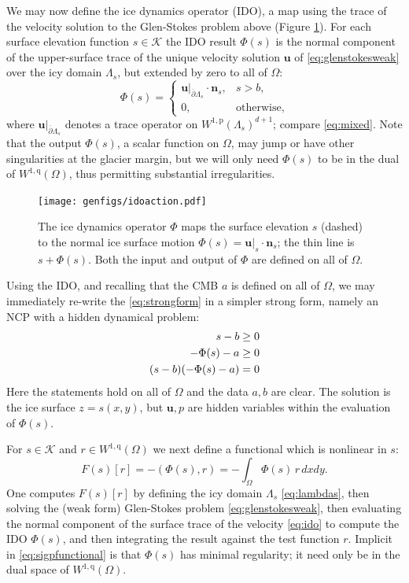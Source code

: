 \documentclass[letterpaper,final,12pt,reqno]{amsart}
\theoremstyle{claim}
\newcommand{\bn}{\mathbf{n}}
\newcommand{\bu}{\mathbf{u}}
\newcommand{\ip}[2]{\left(#1,#2\right)}
\newcommand{\pp}{{\text{p}}}
\newcommand{\qq}{{\text{q}}}
\numberwithin{equation}{section}
\numberwithin{figure}{section}
\numberwithin{table}{section}
\numberwithin{theorem}{section}
\begin{document}
We may now define the ice dynamics operator (IDO), a map using the trace of the velocity solution to the Glen-Stokes problem above (Figure \ref{fig:idoaction}).  For each surface elevation function $s \in \mathcal{K}$ the IDO result $\Phi(s)$ is the normal component of the upper-surface trace of the unique velocity solution $\bu$ of \eqref{eq:glenstokesweak} over the icy domain $\Lambda_s$, but extended by zero to all of $\Omega$:
\begin{equation}
\Phi(s) = \begin{cases} \bu|_{\overline{\partial} \Lambda_s} \cdot \bn_s, & s > b, \\
                        0, & \text{otherwise}, \end{cases} \label{eq:ido}
\end{equation}
where $\bu|_{\overline{\partial} \Lambda_s}$ denotes a trace operator on $W^{1,\pp}(\Lambda_s)^{d+1}$; compare \eqref{eq:mixed}.  Note that the output $\Phi(s)$, a scalar function on $\Omega$, may jump or have other singularities at the glacier margin, but we will only need $\Phi(s)$ to be in the dual of $W^{1,\qq}(\Omega)$, thus permitting substantial irregularities.

\begin{figure}[t]
\begin{center}
\texttt{[image: genfigs/idoaction.pdf]}
\end{center}
\caption{The ice dynamics operator $\Phi$ maps the surface elevation $s$ (dashed) to the normal ice surface motion $\Phi(s)=\bu|_s \cdot \bn_s$; the thin line is $s+\Phi(s)$.  Both the input and output of $\Phi$ are defined on all of $\Omega$.}
\label{fig:idoaction}
\end{figure}

Using the IDO, and recalling that the CMB $a$ is defined on all of $\Omega$, we may immediately re-write the \eqref{eq:strongform} in a simpler strong form, namely an NCP with a hidden dynamical problem:
\begin{align}
s - b &\ge 0  \label{eq:idostrongform} \\
- \Phi(s) - a &\ge 0 \notag \\
(s - b) (- \Phi(s) - a) &= 0 \notag
\end{align}
Here the statements hold on all of $\Omega$ and the data $a,b$ are clear.  The solution is the ice surface $z=s(x,y)$, but $\bu,p$ are hidden variables within the evaluation of $\Phi(s)$.

For $s \in \mathcal{K}$ and $r \in W^{1,\qq}(\Omega)$ we next define a functional which is nonlinear in $s$:
\begin{equation}
F(s)[r] = - \ip{\Phi(s)}{r} = - \int_\Omega \Phi(s)\, r \,dx dy. \label{eq:sigpfunctional}
\end{equation}
One computes $F(s)[r]$ by defining the icy domain $\Lambda_s$ \eqref{eq:lambdas}, then solving the (weak form) Glen-Stokes problem \eqref{eq:glenstokesweak}, then evaluating the normal component of the surface trace of the velocity \eqref{eq:ido} to compute the IDO $\Phi(s)$, and then integrating the result against the test function $r$.  Implicit in \eqref{eq:sigpfunctional} is that $\Phi(s)$ has minimal regularity; it need only be in the dual space of $W^{1,\qq}(\Omega)$.
\end{document}
